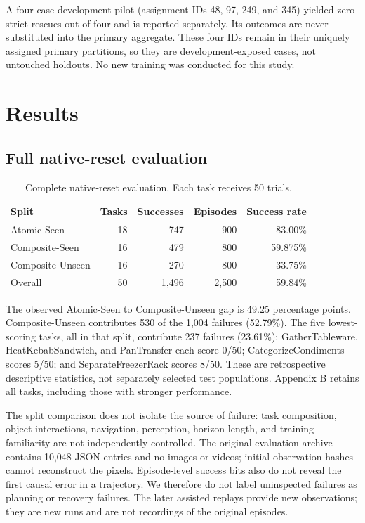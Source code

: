 \documentclass[10pt,twocolumn,letterpaper]{article}
\begin{document}
A four-case development pilot (assignment IDs 48, 97, 249, and 345) yielded zero strict rescues out of four and is reported separately. Its outcomes are never substituted into the primary aggregate. These four IDs remain in their uniquely assigned primary partitions, so they are development-exposed cases, not untouched holdouts. No new training was conducted for this study.


\section{Results}

\subsection{Full native-reset evaluation}

\begin{table}[ht]\centering\footnotesize\begin{tabularx}{\columnwidth}{@{}Xrrrr@{}}\toprule

Split & Tasks & Successes & Episodes & Success rate\\\midrule

Atomic-Seen & 18 & 747 & 900 & 83.00\%\\

Composite-Seen & 16 & 479 & 800 & 59.875\%\\

Composite-Unseen & 16 & 270 & 800 & 33.75\%\\

Overall & 50 & 1,496 & 2,500 & 59.84\%\\

\bottomrule\end{tabularx}

\caption{Complete native-reset evaluation. Each task receives 50 trials.}\end{table}

The observed Atomic-Seen to Composite-Unseen gap is 49.25 percentage points. Composite-Unseen contributes 530 of the 1,004 failures (52.79\%). The five lowest-scoring tasks, all in that split, contribute 237 failures (23.61\%): GatherTableware, HeatKebabSandwich, and PanTransfer each score 0/50; CategorizeCondiments scores 5/50; and SeparateFreezerRack scores 8/50. These are retrospective descriptive statistics, not separately selected test populations. Appendix B retains all tasks, including those with stronger performance.


The split comparison does not isolate the source of failure: task composition, object interactions, navigation, perception, horizon length, and training familiarity are not independently controlled. The original evaluation archive contains 10,048 JSON entries and no images or videos; initial-observation hashes cannot reconstruct the pixels. Episode-level success bits also do not reveal the first causal error in a trajectory. We therefore do not label uninspected failures as planning or recovery failures. The later assisted replays provide new observations; they are new runs and are not recordings of the original episodes.
\end{document}

